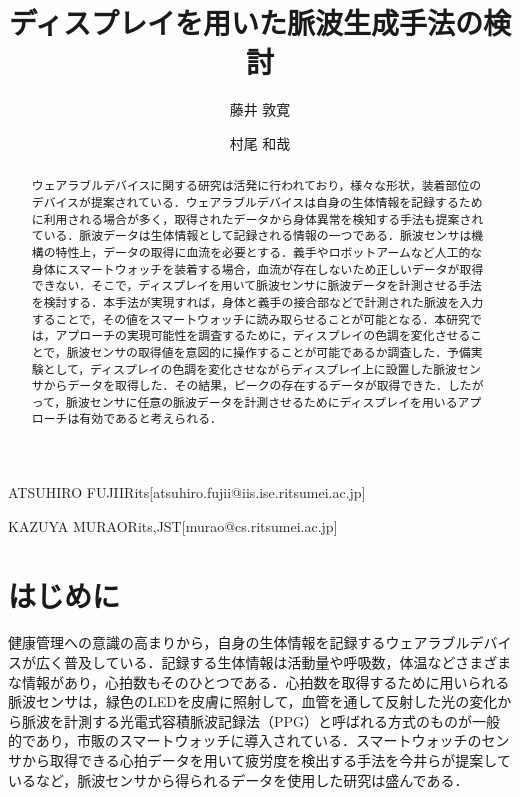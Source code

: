 \documentclass[submit,techrep]{ipsj}
\begin{document}
\title{ディスプレイを用いた脈波生成手法の検討}


\author{藤井 敦寛}{ATSUHIRO FUJII}{Rits}[atsuhiro.fujii@iis.ise.ritsumei.ac.jp]
\author{村尾 和哉}{KAZUYA MURAO}{Rits,JST}[murao@cs.ritsumei.ac.jp]

\begin{abstract}
ウェアラブルデバイスに関する研究は活発に行われており，様々な形状，装着部位のデバイスが提案されている．ウェアラブルデバイスは自身の生体情報を記録するために利用される場合が多く，取得されたデータから身体異常を検知する手法も提案されている．脈波データは生体情報として記録される情報の一つである．脈波センサは機構の特性上，データの取得に血流を必要とする．義手やロボットアームなど人工的な身体にスマートウォッチを装着する場合，血流が存在しないため正しいデータが取得できない．そこで，ディスプレイを用いて脈波センサに脈波データを計測させる手法を検討する．本手法が実現すれば，身体と義手の接合部などで計測された脈波を入力することで，その値をスマートウォッチに読み取らせることが可能となる．本研究では，アプローチの実現可能性を調査するために，ディスプレイの色調を変化させることで，脈波センサの取得値を意図的に操作することが可能であるか調査した．予備実験として，ディスプレイの色調を変化させながらディスプレイ上に設置した脈波センサからデータを取得した．その結果，ピークの存在するデータが取得できた．したがって，脈波センサに任意の脈波データを計測させるためにディスプレイを用いるアプローチは有効であると考えられる．
\end{abstract}

\maketitle





\section{はじめに}
\label{introduction}
健康管理への意識の高まりから，自身の生体情報を記録するウェアラブルデバイスが広く普及している．記録する生体情報は活動量や呼吸数，体温などさまざまな情報があり，心拍数もそのひとつである．心拍数を取得するために用いられる脈波センサは，緑色のLEDを皮膚に照射して，血管を通して反射した光の変化から脈波を計測する光電式容積脈波記録法（PPG）と呼ばれる方式のものが一般的であり，市販のスマートウォッチに導入されている．スマートウォッチのセンサから取得できる心拍データを用いて疲労度を検出する手法を今井ら\cite{fatigue_detection}が提案しているなど，脈波センサから得られるデータを使用した研究は盛んである．
\end{document}

